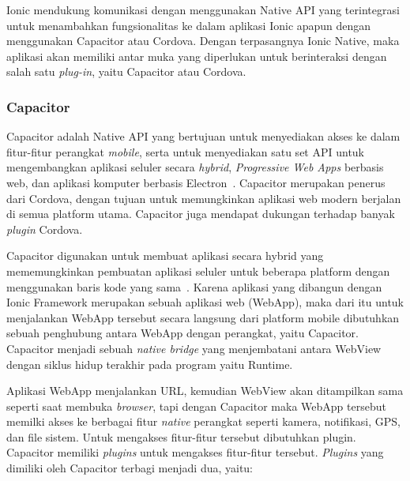 Ionic mendukung komunikasi dengan menggunakan Native API yang terintegrasi untuk menambahkan fungsionalitas ke dalam aplikasi Ionic apapun dengan menggunakan Capacitor atau Cordova. Dengan terpasangnya Ionic Native, maka aplikasi akan memiliki antar muka yang diperlukan untuk berinteraksi dengan salah satu {\it plug-in}, yaitu Capacitor atau Cordova.
\newpage
\subsubsection{Capacitor}
\label{subsec:capacitor}
Capacitor adalah Native API yang bertujuan untuk menyediakan akses ke dalam fitur-fitur perangkat \textit{mobile}, serta untuk menyediakan satu set API untuk mengembangkan aplikasi seluler secara \textit{hybrid}, {\it Progressive Web Apps} berbasis web, dan aplikasi komputer berbasis Electron~\cite{tor:19:software}. Capacitor merupakan penerus dari Cordova, dengan tujuan untuk memungkinkan aplikasi web modern berjalan di semua platform utama. Capacitor juga mendapat dukungan terhadap banyak {\it plugin} Cordova.

Capacitor digunakan untuk membuat aplikasi secara hybrid yang mememungkinkan pembuatan aplikasi seluler untuk beberapa platform dengan menggunakan baris kode yang sama~\cite{huber:21:pwa}. Karena aplikasi yang dibangun dengan Ionic Framework merupakan sebuah aplikasi web (WebApp), maka dari itu untuk menjalankan WebApp tersebut secara langsung dari platform mobile dibutuhkan sebuah penghubung antara WebApp dengan perangkat, yaitu Capacitor. Capacitor menjadi sebuah \textit{native bridge} yang menjembatani antara WebView dengan siklus hidup terakhir pada program yaitu Runtime.

Aplikasi WebApp menjalankan URL, kemudian WebView akan ditampilkan sama seperti saat membuka \textit{browser}, tapi dengan Capacitor maka WebApp tersebut memilki akses ke berbagai fitur \textit{native} perangkat seperti kamera, notifikasi, GPS, dan file sistem. Untuk mengakses fitur-fitur tersebut dibutuhkan plugin. Capacitor memiliki \textit{plugins} untuk mengakses fitur-fitur tersebut. \textit{Plugins} yang dimiliki oleh Capacitor terbagi menjadi dua, yaitu:

